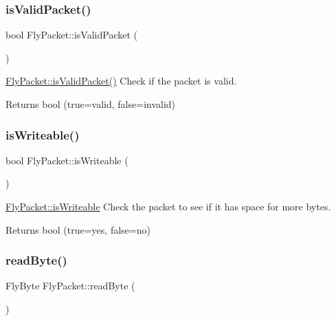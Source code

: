 \subsubsection{\texorpdfstring{is\+Valid\+Packet()}{isValidPacket()}}
{\footnotesize\ttfamily bool Fly\+Packet\+::is\+Valid\+Packet (\begin{DoxyParamCaption}{ }\end{DoxyParamCaption})}



\hyperlink{class_fly_packet_a71175af24ccf498579c804aa21500db5}{Fly\+Packet\+::is\+Valid\+Packet()} Check if the packet is valid. 

\begin{DoxyReturn}{Returns}
bool (true=valid, false=invalid) 
\end{DoxyReturn}
\hypertarget{class_fly_packet_a1e63a54895660739a5232b5b546fcf07}{}\label{class_fly_packet_a1e63a54895660739a5232b5b546fcf07} 
\subsubsection{\texorpdfstring{is\+Writeable()}{isWriteable()}}
{\footnotesize\ttfamily bool Fly\+Packet\+::is\+Writeable (\begin{DoxyParamCaption}{ }\end{DoxyParamCaption})}



\hyperlink{class_fly_packet_a1e63a54895660739a5232b5b546fcf07}{Fly\+Packet\+::is\+Writeable} Check the packet to see if it has space for more bytes. 

\begin{DoxyReturn}{Returns}
bool (true=yes, false=no) 
\end{DoxyReturn}
\hypertarget{class_fly_packet_af3e863f81ee5de3fb73ec200efac0924}{}\label{class_fly_packet_af3e863f81ee5de3fb73ec200efac0924} 
\subsubsection{\texorpdfstring{read\+Byte()}{readByte()}}
{\footnotesize\ttfamily Fly\+Byte Fly\+Packet\+::read\+Byte (\begin{DoxyParamCaption}{ }\end{DoxyParamCaption})}



